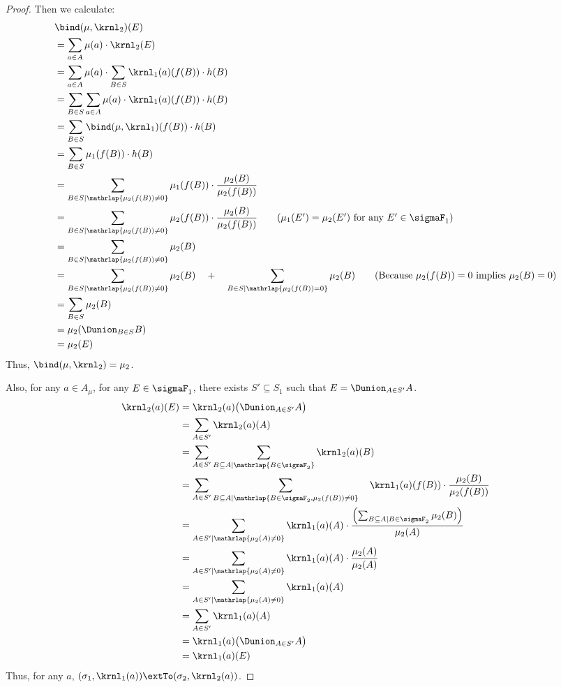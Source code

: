 \documentclass[acmsmall,nonacm,screen,appendix]{acmart}
\begin{document}
\begin{proof}
Then we calculate:
  \begin{align}
      &\bind(\mu, \krnl_2)(E) \notag\\
   &=  \sum_{a\in A} \mu(a) \cdot \krnl_2(E) \notag \\
   &=  \sum_{a\in A} \mu(a) \cdot \sum_{B \in S} \krnl_1(a)(f(B)) \cdot h(B) \notag \\
   &=  \sum_{B \in S}  \sum_{a\in A} \mu(a) \cdot \krnl_1(a)(f(B)) \cdot h(B)  \notag \\
   &=  \sum_{B \in S}  \bind(\mu, \krnl_1)(f(B)) \cdot h(B) \notag  \\
   &=  \sum_{B \in S}  \mu_1(f(B)) \cdot h(B) \notag \\
   &=  \sum_{B \in S \mid \mathrlap{\mu_2(f(B)) \neq 0}}  \mu_1(f(B)) \cdot \frac{\mu_2(B)}{ \mu_2(f(B))} \notag \\
   &=  \sum_{B \in S \mid \mathrlap{\mu_2(f(B)) \neq 0}}  \mu_2(f(B)) \cdot \frac{\mu_2(B)}{\mu_2(f(B))} \tag{$\mu_1(E') = \mu_2(E')$ for any $E' \in \sigmaF_1$}\\
   &=  \sum_{B \in S \mid \mathrlap{\mu_2(f(B)) \neq 0}}  \mu_2(B)  \notag \\
   &=  \sum_{B \in S \mid \mathrlap{\mu_2(f(B)) \neq 0}}  \mu_2(B)
       \quad+\quad
       \sum_{B \in S \mid  \mathrlap{\mu_2(f(B)) = 0}}  \mu_2(B)  \tag{Because $\mu_2(f(B)) = 0$ implies $\mu_2(B) = 0$} \\
   &= \sum_{B \in S}  \mu_2(B) \notag \\
   &= \mu_2(\Dunion_{B \in S} B ) \notag \\
   &= \mu_2(E) \notag
  \end{align}
Thus, $\bind(\mu, \krnl_2)= \mu_2$.

  Also, for any $a \in A_{\mu}$, for any $E \in \sigmaF_1$,
  there exists $S' \subseteq S_1$
  such that $E=\Dunion_{A \in S'} A$.
  \begin{align*}
   \krnl_2(a)(E)
   &= \krnl_2(a)\bigl(\Dunion_{A \in S'} A\bigr) \\
   &= \sum_{A \in S'} \krnl_2(a)(A) \\
   &= \sum_{A \in S'} \sum_{B \subseteq A \mid \mathrlap{B \in \sigmaF_2}} \krnl_2(a)(B)\\
&= \sum_{A \in S'}
        \sum_{B \subseteq A \mid \mathrlap{B \in \sigmaF_2, \mu_2(f(B)) \neq 0}}
          \quad\krnl_1(a)(f(B)) \cdot \frac{\mu_2(B)}{\mu_2(f(B))} \\
&= \sum_{A \in S' \mid \mathrlap{\mu_2(A) \neq 0}} \krnl_1(a)(A) \cdot \frac{\left(\sum_{B \subseteq A \mid B \in \sigmaF_2}  \mu_2(B) \right) }{\mu_2(A)} \\
   &= \sum_{A \in S' \mid \mathrlap{\mu_2(A) \neq 0}} \krnl_1(a)(A) \cdot \frac{ \mu_2(A)}{ \mu_2(A)} \\
   &= \sum_{A \in S' \mid \mathrlap{\mu_2(A) \neq 0}} \krnl_1(a)(A)  \\
   &= \sum_{A \in S'} \krnl_1(a)(A)  \\
   &= \krnl_1(a)\bigl(\Dunion_{A \in S'} A\bigr)  \\
   &= \krnl_1(a)(E)
  \end{align*}
Thus, for any $a$, $(\sigma_1, \krnl_1(a)) \extTo (\sigma_2, \krnl_2(a))$.
\end{proof}
\end{document}
